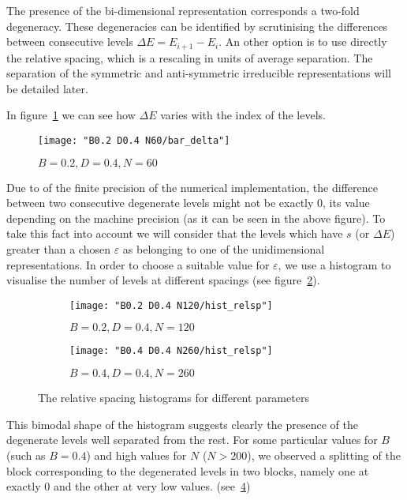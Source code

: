 \documentclass[../thesis.tex]{subfiles}
\begin{document}
The presence of the bi-dimensional representation corresponds a two-fold
degeneracy. These degeneracies can be identified  by scrutinising the
differences between consecutive levels \(\Delta E = E_{i+1} - E_i\).
An other option is to use directly the relative spacing, which is a rescaling
in units of average separation.
The separation of the symmetric and anti-symmetric irreducible representations
will be detailed later.

In figure~\ref{fig:bar_delta} we can see how \(\Delta E\) varies with the index of the
levels.

\begin{figure}[!h]
  \centering
  \texttt{[image: "B0.2 D0.4 N60/bar\_delta"]}
  \caption{\(B=0.2, D=0.4, N=60\)}%
\label{fig:bar_delta}
\end{figure}

Due to of the finite precision of the numerical implementation, the
difference between two consecutive degenerate levels might not be exactly 0,
its value depending on the machine precision (as it can be seen in the above figure).
To take this fact into account we will consider that the levels which
have $s$ (or \(\Delta E\)) greater than a chosen \( \varepsilon \) as belonging
to one of the unidimensional representations.
In order to choose a suitable value for \( \varepsilon \), we use a histogram
to visualise the number of levels at different spacings
(see figure~\ref{fig:relsp-b0.2n120}).

\begin{figure}[h!]
  \centering
  \begin{subfigure}[b]{0.49\textwidth}
    \centering
    \texttt{[image: "B0.2 D0.4 N120/hist\_relsp"]}
    \caption{\(B=0.2, D=0.4, N=120\)}%
    \label{fig:relsp-b0.2n120}  %
  \end{subfigure}
  \begin{subfigure}[b]{0.49\textwidth}
    \centering
    \texttt{[image: "B0.4 D0.4 N260/hist\_relsp"]}
    \caption{\(B=0.4, D=0.4, N=260\)}%
    \label{fig:relsp-b0.4n260}  %
  \end{subfigure}
  \caption{The relative spacing histograms for different parameters}
\end{figure}

This bimodal shape of the histogram suggests clearly the presence of the degenerate
levels well separated from the rest.
For some particular values for $B$ (such as \(B = 0.4\)) and high values for
$N$ (\( N > 200 \)), we observed a splitting of the block corresponding to
the degenerated levels in two blocks, namely one at exactly 0 and the other at
very low values. (see~\cref{fig:relsp-b0.4n260})
\end{document}
